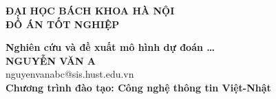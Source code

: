 \documentclass[main.tex]{subfiles}
\begin{document}
\begin{titlepage}
\thispagestyle{empty}
\begin{center}

{\textbf{\large{ĐẠI HỌC BÁCH KHOA HÀ NỘI}}}\\[4cm]

{\textbf{\huge{ ĐỒ ÁN TỐT NGHIỆP}}}\\[1cm]
{\textbf{\Large{Nghiên cứu và đề xuất mô hình dự đoán \ldots }}\\[1cm]

{\textbf{\large{NGUYỄN VĂN A}}}\\
{\large{nguyenvanabc@sis.hust.edu.vn}}\\[0.5cm]

{\textbf{\large{Chương trình đào tạo: Công nghệ thông tin Việt-Nhật}}}%

\vspace{4cm}
\begin{table}[H]
\centering
{}
\end{table}}
\end{center}



\end{titlepage}
\end{document}
